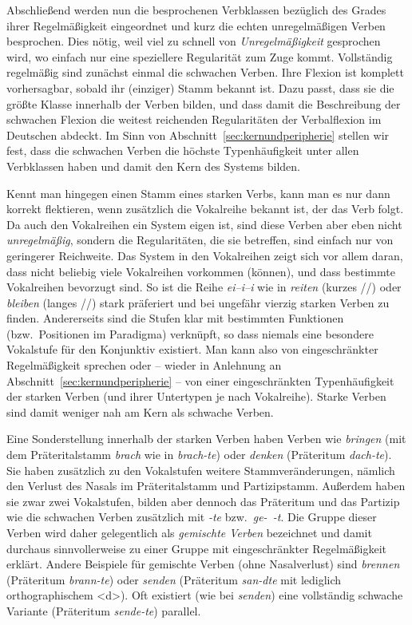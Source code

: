 
Abschließend werden nun die besprochenen Verbklassen bezüglich des Grades ihrer Regelmäßigkeit eingeordnet und kurz die echten unregelmäßigen Verben besprochen.
Dies nötig, weil viel zu schnell von \textit{Unregelmäßigkeit} gesprochen wird, wo einfach nur eine speziellere Regularität zum Zuge kommt.
Vollständig regelmäßig sind zunächst einmal die schwachen Verben.
Ihre Flexion ist komplett vorhersagbar, sobald ihr (einziger) Stamm bekannt ist.
Dazu passt, dass sie die größte Klasse innerhalb der Verben bilden, und dass damit die Beschreibung der schwachen Flexion die weitest reichenden Regularitäten der Verbalflexion im Deutschen abdeckt.
Im Sinn von Abschnitt~\ref{sec:kernundperipherie} stellen wir fest, dass die schwachen Verben die höchste Typenhäufigkeit unter allen Verbklassen haben und damit den Kern des Systems bilden.

Kennt man hingegen einen Stamm eines starken Verbs, kann man es nur dann korrekt flektieren, wenn zusätzlich die Vokalreihe bekannt ist, der das Verb folgt.
Da auch den Vokalreihen ein System eigen ist, sind diese Verben aber eben nicht \textit{unregelmäßig}, sondern die Regularitäten, die sie betreffen, sind einfach nur von geringerer Reichweite.
Das System in den Vokalreihen zeigt sich vor allem daran, dass nicht beliebig viele Vokalreihen vorkommen (können), und dass bestimmte Vokalreihen bevorzugt sind.
So ist \zB die Reihe \textit{ei--i--i} wie in \textit{reiten} (kurzes //) oder \textit{bleiben} (langes //) stark präferiert und bei ungefähr vierzig starken Verben zu finden.
Andererseits sind die Stufen klar mit bestimmten Funktionen (bzw.\ Positionen im Paradigma) verknüpft, so dass \zB niemals eine besondere Vokalstufe für den Konjunktiv existiert.
Man kann also von eingeschränkter Regelmäßigkeit sprechen oder -- wieder in Anlehnung an Abschnitt~\ref{sec:kernundperipherie} -- von einer eingeschränkten Typenhäufigkeit der starken Verben (und ihrer Untertypen je nach Vokalreihe).
Starke Verben sind damit weniger nah am Kern als schwache Verben.

Eine Sonderstellung innerhalb der starken Verben haben Verben wie \textit{bringen} (mit dem Präteritalstamm \textit{brach} wie in \textit{brach-te}) oder \textit{denken} (Präteritum \textit{dach-te}).
Sie haben zusätzlich zu den Vokalstufen weitere Stammveränderungen, nämlich den Verlust des Nasals im Präteritalstamm und Partizipstamm.
Außerdem haben sie zwar zwei Vokalstufen, bilden aber dennoch das Präteritum und das Partizip wie die schwachen Verben zusätzlich mit \textit{-te} bzw.\ \textit{ge-~-t}.
Die Gruppe dieser Verben wird daher gelegentlich als \textit{gemischte Verben} bezeichnet und damit durchaus sinnvollerweise zu einer Gruppe mit eingeschränkter Regelmäßigkeit erklärt.
Andere Beispiele für gemischte Verben (ohne Nasalverlust) sind \textit{brennen} (Präteritum \textit{brann-te}) oder \textit{senden} (Präteritum \textit{san-dte} mit lediglich orthographischem <d>).
Oft existiert (wie bei \textit{senden}) eine vollständig schwache Variante (Präteritum \textit{sende-te}) parallel.

